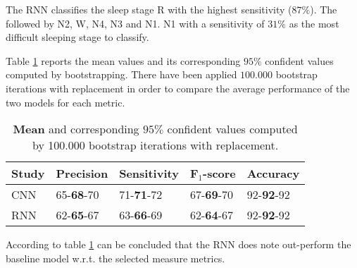 The RNN classifies the sleep stage R with the highest sensitivity ($87\%$). The followed by N2, W, N4, N3 and N1. N1 with a sensitivity of $31\%$ as the most difficult sleeping stage to classify.




Table \ref{tab_res_2} reports the mean values and its corresponding $95\%$ confident values computed by bootstrapping. There have been applied $100.000$ bootstrap iterations with replacement in order to compare the average performance of the two models for each metric. 

\begin{table}[th!]
\centering
\begin{tabular}{l | llll}
Study & Precision & Sensitivity & F$_1$-score & Accuracy \\\hline
CNN               & 65-\textbf{68}-70 & 71-\textbf{71}-72 & 67-\textbf{69}-70 & 92-\textbf{92}-92\\
RNN               & 62-\textbf{65}-67 & 63-\textbf{66}-69 & 62-\textbf{64}-67 & 92-\textbf{92}-92
\end{tabular}
\caption{\textbf{Mean} and corresponding $95\%$ confident values computed by 100.000 bootstrap iterations with replacement.}
\label{tab_res_2}
\end{table}

According to table \ref{tab_res_2} can be concluded that the RNN does note out-perform the baseline model w.r.t. the selected measure metrics.


%



